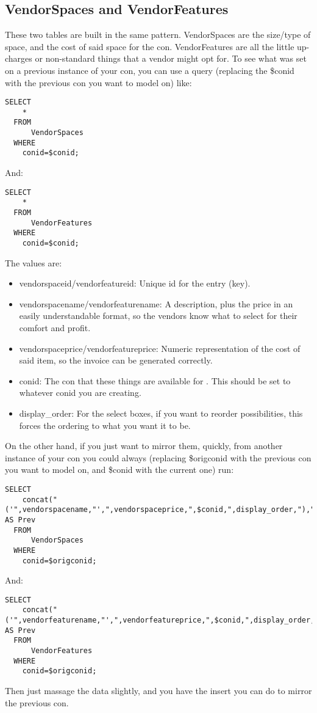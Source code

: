 \documentclass[captions=tablesignature]{scrartcl}
\begin{document}
\subsection{VendorSpaces and VendorFeatures}
\label{sec-14-1}
These two tables are built in the same pattern. VendorSpaces are
the size/type of space, and the cost of said space for the con.
VendorFeatures are all the little up-charges or non-standard things
that a vendor might opt for.  To see what was set on a previous
instance of your con, you can use a query (replacing the \$conid
with the previous con you want to model on) like:
\begin{verbatim}
SELECT
    *
  FROM
      VendorSpaces
  WHERE
    conid=$conid;
\end{verbatim}
And:
\begin{verbatim}
SELECT
    *
  FROM
      VendorFeatures
  WHERE
    conid=$conid;
\end{verbatim}
The values are:
\begin{itemize}
\item vendorspaceid/vendorfeatureid: Unique id for the entry (key).
\item vendorspacename/vendorfeaturename: A description, plus the price
in an easily understandable format, so the vendors know what to
select for their comfort and profit.
\item vendorspaceprice/vendorfeatureprice: Numeric representation of
the cost of said item, so the invoice can be generated
correctly.
\item conid: The con that these things are available for .  This should
be set to whatever conid you are creating.
\item display\_order: For the select boxes, if you want to reorder
possibilities, this forces the ordering to what you want it to
be.
\end{itemize}

On the other hand, if you just want to mirror them, quickly, from
another instance of your con you could always (replacing \$origconid
with the previous con you want to model on, and \$conid with the
current one) run:
\begin{verbatim}
SELECT
    concat("('",vendorspacename,"',",vendorspaceprice,",$conid,",display_order,"),") AS Prev
  FROM
      VendorSpaces
  WHERE
    conid=$origconid;
\end{verbatim}
And:
\begin{verbatim}
SELECT
    concat("('",vendorfeaturename,"',",vendorfeatureprice,",$conid,",display_order,"),") AS Prev
  FROM
      VendorFeatures
  WHERE
    conid=$origconid;
\end{verbatim}
Then just massage the data slightly, and you have the insert you
can do to mirror the previous con.
\end{document}
